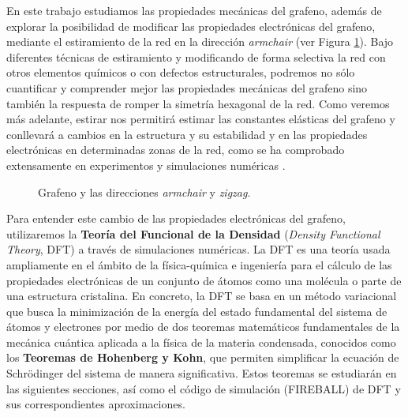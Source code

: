 
En este trabajo estudiamos las propiedades mecánicas del grafeno, además de explorar la posibilidad de modificar las propiedades electrónicas del grafeno, mediante el estiramiento de la red en la dirección \emph{armchair} (ver Figura \ref{fig:1.1}). Bajo diferentes técnicas de estiramiento y modificando de forma selectiva la red con otros elementos químicos o con defectos estructurales, podremos no sólo cuantificar y comprender mejor las propiedades mecánicas del grafeno sino también la respuesta de romper la simetría hexagonal de la red. Como veremos más adelante, estirar nos permitirá estimar las constantes elásticas del grafeno y conllevará a cambios en la estructura y su estabilidad y en las propiedades electrónicas en determinadas zonas de la red, como se ha comprobado extensamente en experimentos y simulaciones numéricas \cite{PhysRevB.81.241412} \cite{MEMARIAN2015348}\cite{LOPEZPOLIN201742} . \\

\begin{figure}[htbp]
    \centering
    \def\svgwidth{.4\textwidth}
    
    \caption{Grafeno y las direcciones \emph{armchair} y \emph{zigzag}. }
    \label{fig:1.1}
\end{figure}

Para entender este cambio de las propiedades electrónicas del grafeno, utilizaremos la \textbf{Teoría del Funcional de la Densidad} (\emph{Density Functional Theory}, DFT) a través de simulaciones numéricas. La DFT \cite{sholl} es una teoría usada ampliamente en el ámbito de la física-química e ingeniería para el cálculo de las propiedades electrónicas de un conjunto de átomos como una molécula o parte de una estructura cristalina. En concreto, la DFT se basa en un método variacional que busca la minimización de la energía del estado fundamental del sistema de átomos y electrones por medio de dos teoremas matemáticos fundamentales de la mecánica cuántica aplicada a la física de la materia condensada, conocidos como los \textbf{Teoremas de Hohenberg y Kohn}, que permiten simplificar la ecuación de Schrödinger del sistema de manera significativa. Estos teoremas se estudiarán en las siguientes secciones, así como el código de simulación (FIREBALL) de DFT y sus correspondientes aproximaciones.\\
